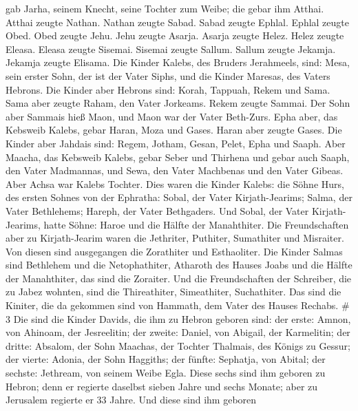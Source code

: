 gab Jarha, seinem Knecht, seine Tochter zum Weibe; die gebar ihm Atthai.
 Atthai zeugte Nathan. Nathan zeugte Sabad. 
Sabad zeugte Ephlal. Ephlal zeugte Obed.  Obed zeugte Jehu.
Jehu zeugte Asarja.  Asarja zeugte Helez. Helez zeugte
Eleasa.  Eleasa zeugte Sisemai. Sisemai zeugte Sallum.
 Sallum zeugte Jekamja. Jekamja zeugte Elisama.
 Die Kinder Kalebs, des Bruders Jerahmeels, sind: Mesa,
sein erster Sohn, der ist der Vater Siphs, und die Kinder Maresas, des
Vaters Hebrons.  Die Kinder aber Hebrons sind: Korah,
Tappuah, Rekem und Sama.  Sama aber zeugte Raham, den Vater
Jorkeams. Rekem zeugte Sammai.  Der Sohn aber Sammais hieß
Maon, und Maon war der Vater Beth-Zurs.  Epha aber, das
Kebsweib Kalebs, gebar Haran, Moza und Gases. Haran aber zeugte Gases.
 Die Kinder aber Jahdais sind: Regem, Jotham, Gesan, Pelet,
Epha und Saaph.  Aber Maacha, das Kebsweib Kalebs, gebar
Seber und Thirhena  und gebar auch Saaph, den Vater
Madmannas, und Sewa, den Vater Machbenas und den Vater Gibeas. Aber
Achsa war Kalebs Tochter.  Dies waren die Kinder Kalebs:
die Söhne Hurs, des ersten Sohnes von der Ephratha: Sobal, der Vater
Kirjath-Jearims;  Salma, der Vater Bethlehems; Hareph, der
Vater Bethgaders.  Und Sobal, der Vater Kirjath-Jearims,
hatte Söhne: Haroe und die Hälfte der Manahthiter.  Die
Freundschaften aber zu Kirjath-Jearim waren die Jethriter, Puthiter,
Sumathiter und Misraiter. Von diesen sind ausgegangen die Zorathiter und
Esthaoliter.  Die Kinder Salmas sind Bethlehem und die
Netophathiter, Atharoth des Hauses Joabs und die Hälfte der Manahthiter,
das sind die Zoraiter.  Und die Freundschaften der
Schreiber, die zu Jabez wohnten, sind die Thireathiter, Simeathiter,
Suchathiter. Das sind die Kiniter, die da gekommen sind von Hammath, dem
Vater des Hauses Rechabs. \# 3  Die sind die Kinder Davids,
die ihm zu Hebron geboren sind: der erste: Amnon, von Ahinoam, der
Jesreelitin; der zweite: Daniel, von Abigail, der Karmelitin;
 der dritte: Absalom, der Sohn Maachas, der Tochter
Thalmais, des Königs zu Gessur; der vierte: Adonia, der Sohn Haggiths;
 der fünfte: Sephatja, von Abital; der sechste: Jethream,
von seinem Weibe Egla.  Diese sechs sind ihm geboren zu
Hebron; denn er regierte daselbst sieben Jahre und sechs Monate; aber zu
Jerusalem regierte er 33 Jahre.  Und diese sind ihm geboren

